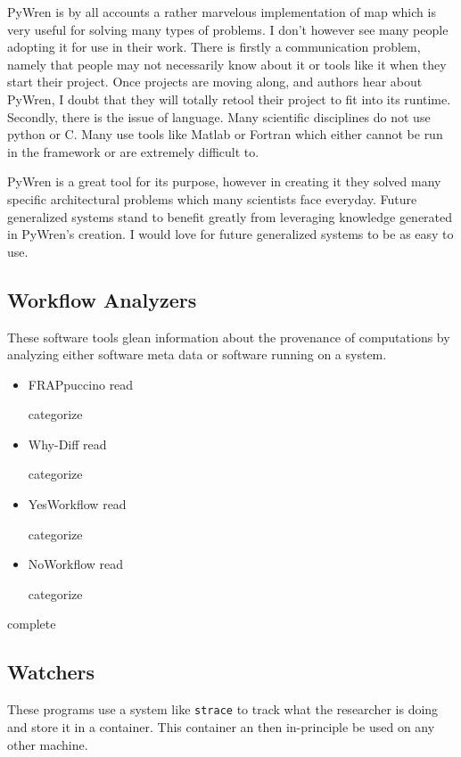 \documentclass[american]{article}
\newcommand{\Read}{
	\gls{read}
}
\newcommand{\categorize}{
	\gls{categorize}
}
\newcommand{\complete}{
	\gls{complete}
}
\begin{document}
PyWren is by all accounts a rather marvelous implementation of map which is very useful for solving many types of problems. I don't however see many people adopting it for use in their work. There is firstly a communication problem, namely that people may not necessarily know about it or tools like it when they start their project. Once projects are moving along, and authors hear about PyWren, I doubt that they will totally retool their project to fit into its runtime. Secondly, there is the issue of language. Many scientific disciplines do not use python or C. Many use tools like Matlab or Fortran which either cannot be run in the framework or are extremely difficult to.

PyWren is a great tool for its purpose, however in creating it they solved many specific architectural problems which many scientists face everyday. Future generalized systems stand to benefit greatly from leveraging knowledge generated in PyWren's creation. I would love for future generalized systems to be as easy to use.

\subsection{Workflow Analyzers} \label{sec:software-analyzers}

These software tools glean information about the provenance of computations by analyzing either software meta data or software running on a system.

\begin{itemize}
\item FRAPpuccino \cite{FRAPpuccino} \Read \categorize
\item Why-Diff \cite{computational-meta-data} \Read \categorize
\item YesWorkflow \cite{computational-meta-data} \Read \categorize
\item NoWorkflow \cite{computational-meta-data} \Read \categorize
\end{itemize}

\complete

\subsection{Watchers} \label{sec:software-watchers}

These programs use a system like \texttt{strace} to track what the researcher is doing and store it in a container. This container an then in-principle be used on any other machine.
\end{document}
